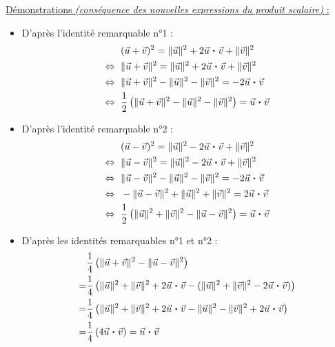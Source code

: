 \documentclass[11pt,a4paper]{article}
\newcommand{\pdt}{\mathbin{\vcenter{\hbox{\scalebox{0.6}{\textbullet}}}}}
\begin{document}
\newpage

\underline{Démonstrations \emph{(conséquence des nouvelles expressions du produit scalaire)} :}

\begin{itemize}
    \item D'après l'identité remarquable n°1 :
    \begin{align*}
            &(\vec{u}+\vec{v})^2=\|\vec{u}\|^2+2\vec{u}\pdt\vec{v}+\|\vec{v}\|^2 \\
            \Leftrightarrow\text{ }&\|\vec{u}+\vec{v}\|^2=\|\vec{u}\|^2+2\vec{u}\pdt\vec{v}+\|\vec{v}\|^2 \\
            \Leftrightarrow\text{ }&\|\vec{u}+\vec{v}\|^2-\|\vec{u}\|^2-\|\vec{v}\|^2=-2\vec{u}\pdt\vec{v} \\
            \Leftrightarrow\text{ }&\frac{1}{2}\left( \|\vec{u}+\vec{v}\|^2-\|\vec{u}\|^2-\|\vec{v}\|^2\right)=\vec{u}\pdt\vec{v}
    \end{align*}
    \item D'après l'identité remarquable n°2 :
    \begin{align*}
            &(\vec{u}-\vec{v})^2=\|\vec{u}\|^2-2\vec{u}\pdt\vec{v}+\|\vec{v}\|^2 \\
            \Leftrightarrow\text{ }&\|\vec{u}-\vec{v}\|^2=\|\vec{u}\|^2-2\vec{u}\pdt\vec{v}+\|\vec{v}\|^2 \\
            \Leftrightarrow\text{ }&\|\vec{u}-\vec{v}\|^2-\|\vec{u}\|^2-\|\vec{v}\|^2=-2\vec{u}\pdt\vec{v} \\
            \Leftrightarrow\text{ }&-\|\vec{u}-\vec{v}\|^2+\|\vec{u}\|^2+\|\vec{v}\|^2=2\vec{u}\pdt\vec{v} \\
            \Leftrightarrow\text{ }&\frac{1}{2}\left(\|\vec{u}\|^2+\|\vec{v}\|^2 - \|\vec{u}-\vec{v}\|^2\right)=\vec{u}\pdt\vec{v}
    \end{align*}
    \item D'après les identités remarquables n°1 et n°2 :
    \begin{align*}
        &\frac{1}{4}\left( \|\vec{u}+\vec{v}\|^2 - \|\vec{u}-\vec{v}\|^2 \right) \\
        =& \frac{1}{4} \left( \|\vec{u}\|^2+\|\vec{v}\|^2+2\vec{u}\pdt\vec{v} -  (\|\vec{u}\|^2+\|\vec{v}\|^2-2\vec{u}\pdt\vec{v}) \right) \\
        =& \frac{1}{4} \left( \|\vec{u}\|^2+\|\vec{v}\|^2+2\vec{u}\pdt\vec{v} - \|\vec{u}\|^2-\|\vec{v}\|^2+2\vec{u}\pdt\vec{v} \right) \\
        =&\frac{1}{4}\left( 4\vec{u}\pdt\vec{v} \right) = \vec{u}\pdt\vec{v}
\end{align*}
\end{itemize}
\end{document}
